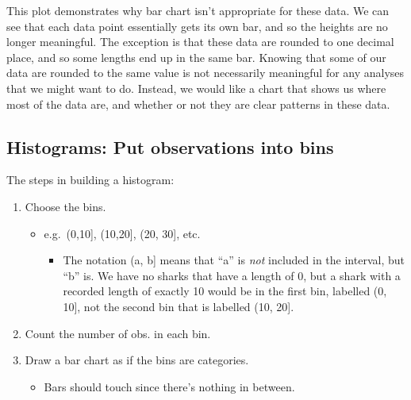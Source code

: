 \documentclass[
  letterpaper,
  DIV=11,
  numbers=noendperiod]{scrreprt}
\providecommand{\tightlist}{%
  \setlength{\itemsep}{0pt}\setlength{\parskip}{0pt}}\usepackage{longtable,booktabs,array}
\begin{document}
This plot demonstrates why bar chart isn't appropriate for these data.
We can see that each data point essentially gets its own bar, and so the
heights are no longer meaningful. The exception is that these data are
rounded to one decimal place, and so some lengths end up in the same
bar. Knowing that some of our data are rounded to the same value is not
necessarily meaningful for any analyses that we might want to do.
Instead, we would like a chart that shows us where most of the data are,
and whether or not they are clear patterns in these data.

\hypertarget{histograms-put-observations-into-bins}{%
\subsection{Histograms: Put observations into
bins}\label{histograms-put-observations-into-bins}}

The steps in building a histogram:

\begin{enumerate}
\def\labelenumi{\arabic{enumi}.}
\tightlist
\item
  Choose the bins.

  \begin{itemize}
  \tightlist
  \item
    e.g.~(0,10{]}, (10,20{]}, (20, 30{]}, etc.

    \begin{itemize}
    \tightlist
    \item
      The notation (a, b{]} means that ``a'' is \emph{not} included in
      the interval, but ``b'' is. We have no sharks that have a length
      of 0, but a shark with a recorded length of exactly 10 would be in
      the first bin, labelled (0, 10{]}, not the second bin that is
      labelled (10, 20{]}.
    \end{itemize}
  \end{itemize}
\item
  Count the number of obs. in each bin.
\item
  Draw a bar chart as if the bins are categories.

  \begin{itemize}
  \tightlist
  \item
    Bars should touch since there's nothing in between.
  \end{itemize}
\end{enumerate}
\end{document}
